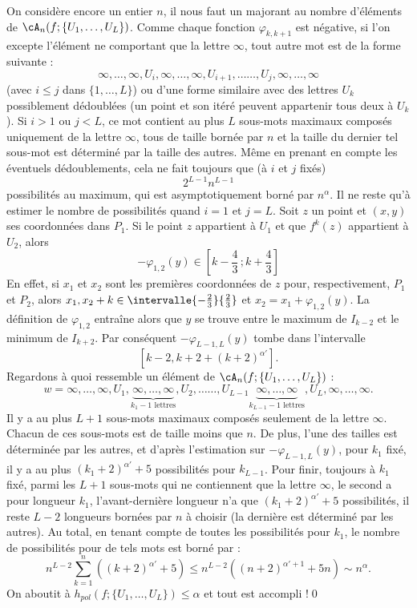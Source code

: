 \begin{proofc}
\begin{step}
On considère encore un entier $n$, il nous faut un majorant au nombre d'éléments de $\cA_n (f; \{U_1, \dots, U_L\})$. Comme chaque fonction $\varphi_{k,k+1}$ est négative, si l'on excepte l'élément ne comportant que la lettre $\infty$, tout autre mot est de la forme suivante :
\[
{\infty, \dots,\infty}, U_i, {\infty, \dots,\infty}, U_{i+1},
\dots \dots, U_{j}, {\infty, \dots, \infty}
\]
(avec $i \leq j$ dans $\{1, \dots, L\}$) ou d'une forme similaire avec des lettres $U_k$ possiblement dédoublées (un point et son itéré peuvent appartenir tous deux à $U_k$). Si $i>1$ ou $j <L$, {ce mot contient au plus} $L$ sous-mots {maximaux} composés uniquement de la lettre $\infty$, tous de taille bornée par $n$ et la taille du dernier tel sous-mot est déterminé par la taille des autres. Même en prenant en compte les éventuels dédoublements, cela ne fait toujours que (à $i$ et $j$ fixés)
\[
2^{L-1}n^{L-1}
\]
possibilités au maximum, qui est asymptotiquement borné par $n^\alpha$. Il ne reste qu'à estimer le nombre de possibilités quand $i=1$ et $j=L$. Soit $z$ un point et $(x,y)$ ses coordonnées dans $P_1$. Si le point $z$ appartient à $U_1$ et que $f^k(z)$ appartient à $U_2$, alors
\[
-\varphi_{1,2}(y) \in \left[k-\frac{4}{3}\,;k+\frac{4}{3}\right]
\]
En effet, si $x_1$ et $x_2$ sont les premières coordonnées de $z$ pour, respectivement, $P_1$ et $P_2$, alors $x_1, x_2+k \in \intervalle{-\frac{2}{3}}{\frac{2}{3}}$ et $x_2 = x_{1} +\varphi_{1,2}(y)$. La définition de $\varphi_{1,2}$ entraîne alors que $y$ se trouve entre le maximum de $I_{k-2}$ et le minimum de $I_{k+2}$. Par conséquent $-\varphi_{L-1,L}(y)$ tombe dans l'intervalle
\[
[k-2, k+2+(k+2)^{\alpha'}].
\]
Regardons à quoi ressemble un élément de $\cA_n (f; \{U_1, \dots, U_L\})$ :
\[
w={\infty, \dots,\infty}, U_1,
\underbrace{\infty, \dots,\infty}_{k_1-1 \text{ lettres}}, U_{2},
\dots \dots, U_{L-1}
\underbrace{\infty, \dots,\infty}_{k_{L-1}-1 \text{ lettres}}, U_{L}, {\infty, \dots, \infty}.
\]
Il y a au plus $L+1$ sous-mots {maximaux} composés seulement de la lettre $\infty$. Chacun de ces sous-mots est de taille moins que $n$. De plus, l'une des tailles est déterminée par les autres, {et d'après l'estimation sur $-\varphi_{L-1,L}(y)$,} pour $k_1$ fixé, il y a au plus $(k_1+2)^{\alpha'}+5$ possibilités pour $k_{L-1}$. Pour finir, toujours à $k_1$ fixé, {parmi les $L+1$ sous-mots qui ne contiennent que la lettre $\infty$, le second a pour longueur $k_{1}$, l'avant-dernière longueur n'a que $(k_1+2)^{\alpha'}+5$ possibilités, il reste $L-2$ longueurs bornées par $n$ à choisir (la dernière est déterminé par les autres).} Au total, {en tenant compte de toutes les possibilités pour $k_{1}$}, le nombre de possibilités pour de tels mots est borné par :
\[
n^{L-2} \sum_{k=1}^n ((k+2)^{\alpha'}+5) \leq n^{L-2} \left((n+2)^{\alpha'+1} + 5n\right) \sim n^{\alpha}.
\]
On aboutit à $h_{pol}(f; \{U_1, \dots, U_L\}) \leq \alpha$ et tout est accompli !\qed
\end{step}
\let\qed\relax
\end{proofc}

